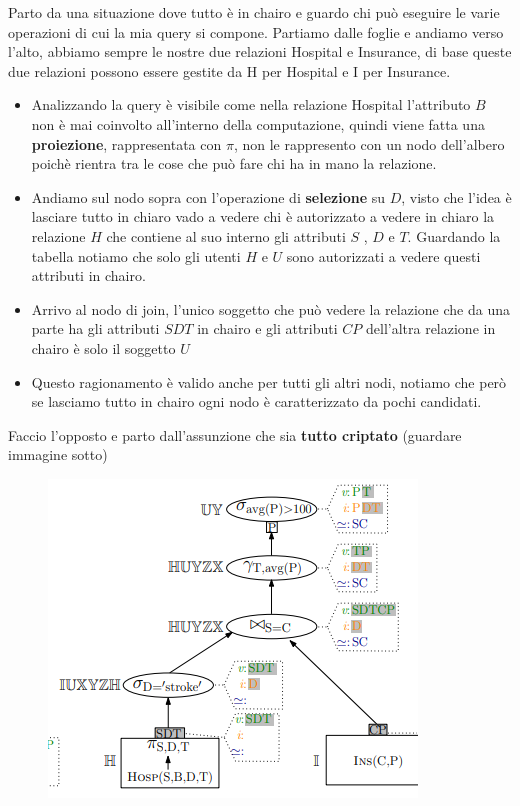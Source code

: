 \documentclass{report}
\begin{document}
Parto da una situazione dove tutto è in chairo e guardo chi può eseguire le varie operazioni di cui la mia query si compone. Partiamo 
dalle foglie e andiamo verso l'alto, abbiamo sempre le nostre due relazioni Hospital e Insurance, di base queste due relazioni
possono essere gestite da H per Hospital e I per Insurance.
\begin{itemize}
    \item Analizzando la query è visibile come nella relazione Hospital l'attributo $B$ non è mai coinvolto all'interno della computazione,
quindi viene fatta una \textbf{proiezione}, rappresentata con $\pi$, non le rappresento con un nodo dell'albero poichè rientra tra le cose che può fare
chi ha in mano la relazione.
    \item Andiamo sul nodo sopra con l'operazione di \textbf{selezione} su $D$, visto che l'idea è lasciare tutto in chiaro vado a vedere chi è autorizzato a vedere in chiaro la relazione $H$ che contiene
al suo interno gli attributi $S$ , $D$ e $T$. Guardando la tabella notiamo che solo gli utenti $H$ e $U$ sono autorizzati a vedere questi attributi in chairo.
    \item Arrivo al nodo di join, l'unico soggetto che può vedere la relazione che da una parte ha gli attributi $SDT$ in chairo e gli attributi $CP$ dell'altra relazione in chairo è solo il soggetto $U$
    \item Questo ragionamento è valido anche per tutti gli altri nodi, notiamo che però se lasciamo tutto in chairo ogni nodo è caratterizzato da pochi candidati.  
\end{itemize}

\noindent Faccio l'opposto e parto dall'assunzione che sia \textbf{tutto criptato} (guardare immagine sotto)
\begin{figure}[H]
    \centering
    \includegraphics[width=0.6\linewidth]{images/cal2.png}
\end{figure}
\end{document}
